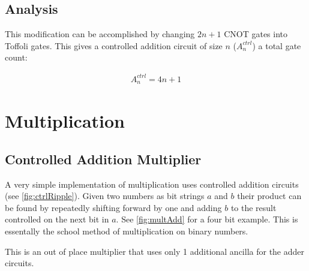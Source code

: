     \subsection{Analysis}

      This modification can be accomplished by changing $2n+1$ CNOT gates into
      Toffoli gates.  This gives a controlled addition circuit of size $n$
      ($A^{ctrl}_n$) a total gate count:

      \begin{align} \label{eq:cadd}
        A^{ctrl}_n = 4n+1
      \end{align}


\section{Multiplication}
  \subsection{Controlled Addition Multiplier}

    A very simple implementation of multiplication uses controlled addition
    circuits (see \cref{fig:ctrlRipple}).  Given two numbers as bit strings $a$
    and $b$ their product can be found by repeatedly shifting forward by one
    and adding $b$ to the result controlled on the next bit in $a$.  See
    \cref{fig:multAdd} for a four bit example. This is essentally the school
    method of multiplication on binary numbers.

    This is an out of place multiplier that uses only 1 additional ancilla for
    the adder circuits.

